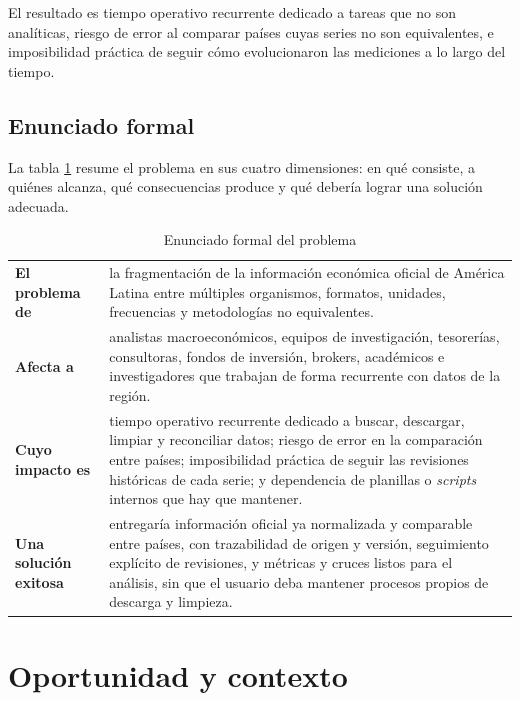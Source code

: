 \documentclass[11pt,a4paper]{article}
\begin{document}
El resultado es tiempo operativo recurrente dedicado a tareas que no son
anal\'iticas, riesgo de error al comparar pa\'ises cuyas series no son
equivalentes, e imposibilidad pr\'actica de seguir c\'omo evolucionaron las
mediciones a lo largo del tiempo.

\subsection{Enunciado formal}

La tabla \ref{tab:problema} resume el problema en sus cuatro dimensiones: en
qu\'e consiste, a qui\'enes alcanza, qu\'e consecuencias produce y qu\'e
deber\'ia lograr una soluci\'on adecuada.

\begin{table}[htbp]
\centering
\begin{tabularx}{\textwidth}{>{\bfseries}l X}
\toprule
El problema de & la fragmentaci\'on de la informaci\'on econ\'omica oficial de
Am\'erica Latina entre m\'ultiples organismos, formatos, unidades, frecuencias
y metodolog\'ias no equivalentes. \\
\addlinespace
Afecta a & analistas macroecon\'omicos, equipos de investigaci\'on,
tesorer\'ias, consultoras, fondos de inversi\'on, brokers, acad\'emicos e
investigadores que trabajan de forma recurrente con datos de la regi\'on. \\
\addlinespace
Cuyo impacto es & tiempo operativo recurrente dedicado a buscar, descargar,
limpiar y reconciliar datos; riesgo de error en la comparaci\'on entre
pa\'ises; imposibilidad pr\'actica de seguir las revisiones hist\'oricas de
cada serie; y dependencia de planillas o \emph{scripts} internos que hay que
mantener. \\
\addlinespace
Una soluci\'on exitosa & entregar\'ia informaci\'on oficial ya normalizada y
comparable entre pa\'ises, con trazabilidad de origen y versi\'on, seguimiento
expl\'icito de revisiones, y m\'etricas y cruces listos para el an\'alisis, sin
que el usuario deba mantener procesos propios de descarga y limpieza. \\
\bottomrule
\end{tabularx}
\caption{Enunciado formal del problema}
\label{tab:problema}
\end{table}

\section{Oportunidad y contexto}
\end{document}
